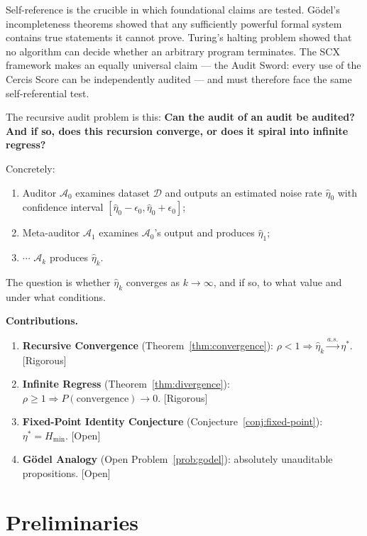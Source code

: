 \documentclass[12pt,a4paper]{article}
\newcommand{\rigorous}{\textcolor{green!50!black}{\small\textsf{[Rigorous]}}}
\newcommand{\openquest}{\textcolor{red!70!black}{\small\textsf{[Open]}}}
\newcommand{\cD}{\mathcal{D}}
\newcommand{\cA}{\mathcal{A}}
\begin{document}
Self-reference is the crucible in which foundational claims are tested.
G\"odel's incompleteness theorems showed that any sufficiently powerful formal
system contains true statements it cannot prove.  Turing's halting problem
showed that no algorithm can decide whether an arbitrary program terminates.
The \textsf{SCX} framework makes an equally universal claim --- the Audit Sword: every use
of the Cercis Score can be independently audited --- and must therefore face the
same self-referential test.

The recursive audit problem is this: \textbf{Can the audit of an audit be
audited?  And if so, does this recursion converge, or does it spiral into
infinite regress?}

Concretely:
\begin{enumerate}[label=(\arabic*)]
    \item Auditor $\cA_0$ examines dataset $\cD$ and outputs an estimated
          noise rate $\hat{\eta}_0$ with confidence interval
          $[\hat{\eta}_0-\epsilon_0,\hat{\eta}_0+\epsilon_0]$;
    \item Meta-auditor $\cA_1$ examines $\cA_0$'s output and produces $\hat{\eta}_1$;
    \item $\cdots$ $\cA_k$ produces $\hat{\eta}_k$.
\end{enumerate}

The question is whether $\hat{\eta}_k$ converges as $k\to\infty$, and if so,
to what value and under what conditions.

\medskip\noindent
\textbf{Contributions.}
\begin{enumerate}[label=(\arabic*)]
    \item \textbf{Recursive Convergence} (Theorem~\ref{thm:convergence}):
          $\rho<1\Rightarrow\hat{\eta}_k\xrightarrow{a.s.}\eta^*$.  \rigorous
    \item \textbf{Infinite Regress} (Theorem~\ref{thm:divergence}):
          $\rho\geq1\Rightarrow P(\text{convergence})\to0$.  \rigorous
    \item \textbf{Fixed-Point Identity Conjecture} (Conjecture~\ref{conj:fixed-point}):
          $\eta^*=H_{\min}$.  \openquest
    \item \textbf{G\"odel Analogy} (Open Problem~\ref{prob:godel}):
          absolutely unauditable propositions.  \openquest
\end{enumerate}

\section{Preliminaries}
\end{document}
